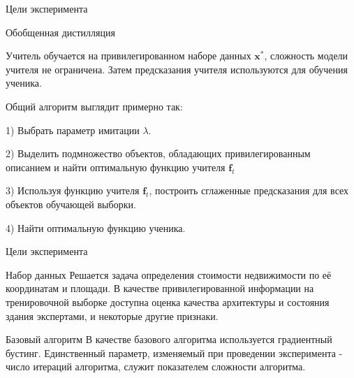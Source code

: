 \documentclass{beamer}
\begin{document}
\begin{frame}{Цели эксперимента}

\begin{block}{Обобщенная дистилляция}

 Учитель обучается на  привилегированном наборе данных $\mathbf{x}^*$,  сложность модели учителя не ограничена.  Затем предсказания учителя используются для обучения ученика.

Общий алгоритм выглядит примерно так:

1) Выбрать параметр имитации $\lambda$.

2) Выделить подмножество объектов, обладающих привилегированным описанием и найти оптимальную функцию учителя $\mathbf{f}_t$

3) Используя функцию учителя $\mathbf{f}_t$, построить сглаженные предсказания для всех объектов обучающей выборки.

4) Найти оптимальную функцию ученика.

\end{block}

\end{frame}


\begin{frame}{Цели эксперимента}

\begin{block}{Набор данных}
Решается задача определения стоимости недвижимости по её координатам и площади. В качестве привилегированной информации на тренировочной выборке доступна оценка качества архитектуры и состояния здания экспертами, и некоторые другие признаки.
\end{block}


\begin{block}{Базовый алгоритм}
 В качестве базового алгоритма используется градиентный бустинг. Единственный параметр,
 изменяемый при проведении эксперимента - число итераций алгоритма, служит показателем сложности алгоритма.
\end{block}


\end{frame}
\end{document}
